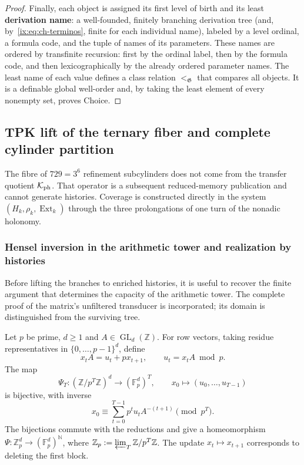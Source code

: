 \begin{proof}
Finally, each object is assigned its first level of birth and its least
\textbf{derivation name}: a well-founded, finitely branching derivation tree
(and, by~\eqref{ix:eq:ch-terminos}, finite for each individual name), labeled by
a level ordinal, a formula code, and the tuple of names of its parameters.
These names are ordered by transfinite recursion: first by the ordinal label,
then by the formula code, and then lexicographically by the already ordered
parameter names. The least name of each value defines a class relation
\(<_{\mathfrak G}\) that compares all objects. It is a definable global
well-order and, by taking the least element of every nonempty set, proves
Choice.
\end{proof}


\subsection{TPK lift of the ternary fiber and complete cylinder partition}
\label{ix:subsec:elevacion-catalogal-ch}

The fibre of \(729=3^6\) refinement subcylinders does not come from the transfer quotient
\(\mathcal K_{\rm ph}\). That operator is a subsequent reduced-memory
publication and cannot generate histories. Coverage is constructed directly
in the system \((H_k,\rho_k,\operatorname{Ext}_k)\) through the three
prolongations of one turn of the nonadic holonomy.


\subsubsection{Hensel inversion in the arithmetic tower and realization by histories}
\label{ix:sec:ch-capacidad-hensel}

Before lifting the branches to enriched histories, it is useful to recover the
finite argument that determines the capacity of the arithmetic tower. The
complete proof of the matrix’s unfiltered transducer is
incorporated; its domain is distinguished from the surviving tree.

\begin{proposition}
\label{ix:prop:ch-hensel-bruto}
Let \(p\) be prime, \(d\geq1\) and \(A\in\operatorname{GL}_d(\mathbb Z)\).
For row vectors, taking residue representatives in
\(\{0,\ldots,p-1\}^d\), define
\[
 x_tA=u_t+px_{t+1},\qquad u_t=x_tA\bmod p.
\]
The map
\[
 \Psi_T:(\mathbb Z/p^T\mathbb Z)^d\longrightarrow
             (\mathbb F_p^d)^T,\qquad
 x_0\longmapsto(u_0,\ldots,u_{T-1})
\]
is bijective, with inverse
\[
 x_0\equiv\sum_{t=0}^{T-1}p^tu_tA^{-(t+1)}\pmod{p^T}.
\]
The bijections commute with the reductions and give a homeomorphism
\(\Psi:\mathbb Z_p^d\to(\mathbb F_p^d)^{\mathbb N}\), where
\(\mathbb Z_p:=\varprojlim_T\mathbb Z/p^T\mathbb Z\). The update
\(x_t\mapsto x_{t+1}\) corresponds to deleting the first block.
\end{proposition}

